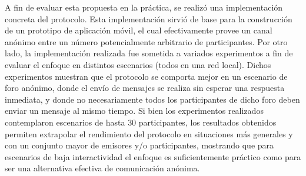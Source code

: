 A fin de evaluar esta propuesta en la práctica, se realizó una implementación 
concreta del protocolo. Esta implementación sirvió de base para la 
construcción de un prototipo de aplicación móvil, el cual efectivamente provee 
un canal anónimo entre un número potencialmente arbitrario de participantes. 
Por otro lado, la implementación realizada fue sometida a variados 
experimentos a fin de evaluar el enfoque en distintos escenarios (todos en una 
red local). Dichos experimentos muestran que el protocolo se comporta mejor en 
un escenario de foro anónimo, donde el envío de mensajes se realiza sin 
esperar una respuesta inmediata, y donde no necesariamente todos los 
participantes de dicho foro deben enviar un mensaje al mismo tiempo. 
Si bien los experimentos realizados contemplaron escenarios de hasta $30$ 
participantes, los resultados obtenidos permiten extrapolar el rendimiento del 
protocolo en situaciones más generales y con un conjunto mayor de emisores y/o 
participantes, mostrando que para escenarios de baja interactividad el enfoque 
es suficientemente práctico como para ser una alternativa efectiva de 
comunicación anónima.